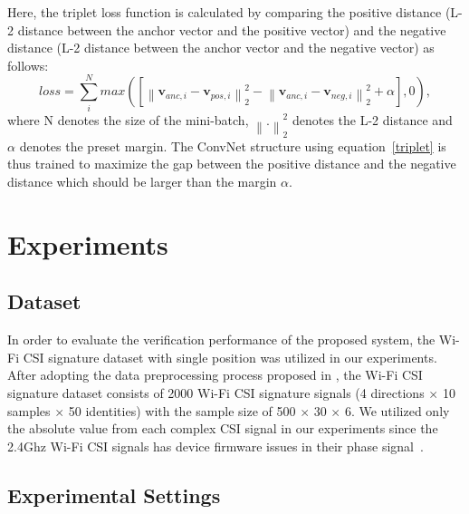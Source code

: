 \documentclass[runningheads]{llncs}
\begin{document}
Here, the triplet loss function is calculated by comparing the positive distance (L-2 distance between the anchor vector and the positive vector) and the negative distance (L-2 distance between the anchor vector and the negative vector) as follows:
\begin{equation}
    loss = \sum_i^N max\left({ \left[ {\left\| {{\mathbf{v}_{anc,i}} - {\mathbf{v}_{pos,i}}} \right\|_2^2} - {\left\| {{\mathbf{v}_{anc,i}} - {\mathbf{v}_{neg,i}}} \right\|_2^2}  + \alpha \right]}, 0 \right),\label{triplet}
\end{equation} 
where N denotes the size of the mini-batch, ${\left\| . \right\|_2^2}$ denotes the L-2 distance and $\alpha$ denotes the preset margin.
The ConvNet structure using equation~\eqref{triplet} is thus trained to maximize the gap between the positive distance and the negative distance which should be larger than the margin $\alpha$.

\section{Experiments}

\subsection{Dataset}
 In order to evaluate the verification performance of the proposed system, the Wi-Fi CSI signature dataset \cite{moon2017air} with single position was utilized in our experiments. After adopting the data preprocessing process proposed in \cite{moon2017air}, the Wi-Fi CSI signature dataset consists of 2000 Wi-Fi CSI signature signals (4 directions $\times$ 10 samples $\times$ 50 identities) with the sample size of 500 $\times$ 30 $\times$ 6. We utilized only the absolute value from each complex CSI signal in our experiments since the 2.4Ghz Wi-Fi CSI signals has device firmware issues in their phase signal~\cite{wang2015understanding}.

\subsection{Experimental Settings}
\end{document}

